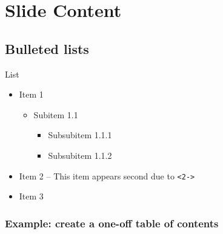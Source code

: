 \documentclass[aspectratio=169, 12pt]{beamer}    %
\begin{document}
\section{Slide Content}



\subsection{Bulleted lists}
\begin{frame}[fragile]{List}
    \begin{itemize}
        \item Item 1
        \begin{itemize}
            \item Subitem 1.1
            \begin{itemize}
                \item Subsubitem  1.1.1
                \item Subsubitem 1.1.2
            \end{itemize}
        \end{itemize}
        \item<2-> Item 2 -- This item appears second due to \verb|<2->|
        \item Item 3
    \end{itemize}
\end{frame}



\begin{sectionframe}
    \frametitle{Example: create a one-off table of contents}
    \setlength{\parskip}{0ex}
\tableofcontents[ 
    	currentsubsection, 
        sectionstyle=show/shaded, 
        subsectionstyle=show/show/hide,
    ] 
    

 
\end{sectionframe}
\end{document}
